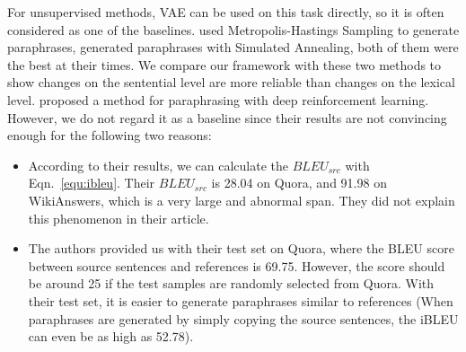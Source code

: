 For unsupervised methods, VAE\citep{kingma2013auto} can be used on this task directly, so it is often considered as one of the baselines. \citet{miao2019cgmh} used Metropolis-Hastings Sampling to generate paraphrases, \citet{liu2019unsupervised} generated paraphrases with Simulated Annealing, both of them were the best at their times. 
We compare our framework with these two methods to show changes on the sentential level are more reliable than changes on the lexical level.
\citet{pup2020} proposed a method for paraphrasing with deep reinforcement learning. However, we do not regard it as a baseline since their results are not convincing enough for the following two reasons:
\begin{itemize}
\item{According to their results, we can calculate the $BLEU_{src}$ with  Eqn.~\ref{equ:ibleu}. Their $BLEU_{src}$ is 28.04 on Quora, and 91.98 on WikiAnswers, which is a very large and abnormal span. They did not explain this phenomenon in their article.}
\item{The authors provided us with their test set on Quora, where the BLEU score between source sentences and references is 69.75. However, the score should be around 25 if the test samples are randomly selected from Quora. With their test set, it is easier to generate paraphrases similar to references (When paraphrases are generated by simply copying the source sentences, the iBLEU can even be as high as 52.78). }
\end{itemize}



